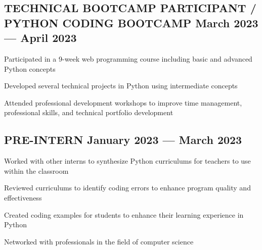 \subsection{{TECHNICAL BOOTCAMP PARTICIPANT / PYTHON CODING BOOTCAMP \hfill March 2023 --- April 2023}}
\begin{zitemize}
\item Participated in a 9-week web programming course including basic and advanced Python concepts
\item Developed several technical projects in Python using intermediate concepts
\item Attended professional development workshops to improve time management, professional skills, and technical portfolio development 
\end{zitemize}

\subsection{{PRE-INTERN \hfill January 2023 --- March 2023}}
\begin{zitemize}
\item Worked with other interns to synthesize Python curriculums for teachers to use within the classroom
\item Reviewed curriculums to identify coding errors to enhance program quality and effectiveness
\item Created coding examples for students to enhance their learning experience in Python
\item Networked with professionals in the field of computer science
\end{zitemize}

